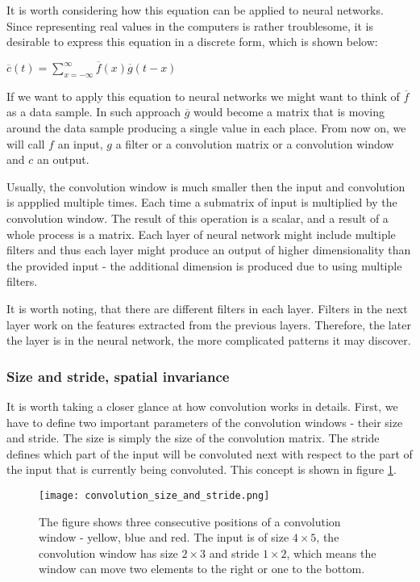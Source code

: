 \documentclass[a4paper,10pt]{report}
\begin{document}
	  It is worth considering how this equation can be applied to neural networks. Since representing real values in the computers is rather troublesome, it is desirable to express this equation in a discrete form, which is shown below: 
	  \begin{center}
	  $\overline{c}(t) = \sum\limits_{x = -\infty}^\infty \overline{f}(x)\overline{g}(t-x)$  
	  \end{center}
	  
	  If we want to apply this equation to neural networks we might want to think of $\overline{f}$ as a data sample. In such approach $\overline{g}$ would become a matrix that is moving around the data sample producing a single value in each place. From now on, we will call $f$ an input, $g$ a filter or a convolution matrix or a convolution window and $c$ an output. 
	  
	  Usually, the convolution window is much smaller then the input and convolution is appplied multiple times. Each time a  submatrix of input is multiplied by the convolution window. The result of this operation is a scalar, and a result of a whole process is a matrix. Each layer of neural network might include multiple filters and thus each layer might produce an output of higher dimensionality than the provided input - the additional dimension is produced due to using multiple filters. 
	  
	  It is worth noting, that there are different filters in each layer. Filters in the next layer work on the features extracted from the previous layers. Therefore, the later the layer is in the neural network, the more complicated patterns it may discover. 
	  
	  \subsubsection{Size and stride, spatial invariance}
	  
	  It is worth taking a closer glance at how convolution works in details. First, we have to define two important parameters of the convolution windows - their size and stride. The size is simply the size of the convolution matrix. The stride defines which part of the input will be convoluted next with respect to the part of the input that is currently being convoluted. This concept is shown in figure \ref{fig:convolution_size_and_stride}. 
	  
	  
	  \begin{figure}[h!]
	    \centering
	    \texttt{[image: convolution\_size\_and\_stride.png]}
	    \caption{The figure shows three consecutive positions of a convolution window - yellow, blue and red. The input is of size $4\times5$, the convolution window has size $2\times3$ and stride $1\times2$, which means the window can move two elements to the right or one to the bottom.}
	    \label{fig:convolution_size_and_stride}
	  \end{figure} 
	  
\end{document}
